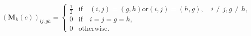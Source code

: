 \begin{equation}
	\left(
	\mathbf{M}_{k}
	\left(
	c
	\right)
	\right)_{ij, gh}
	=
	\begin{cases}
		\frac{1}{2}
		  &   
		\text{if}
		\quad
		\left( i, j \right) = \left( g, h \right)
		\text{or}
		\left( i, j \right) = \left( h, g \right),
		\quad
		i \neq j
		,
		g \neq h, \\
		0
		  &   
		\text{if}
		\quad
		i = j = g = h
		,
		\\
		0
		  &   
		\text{otherwise}
		.
	\end{cases}
	\label{eq:linearAlgebra-mcap-cor}
\end{equation}

